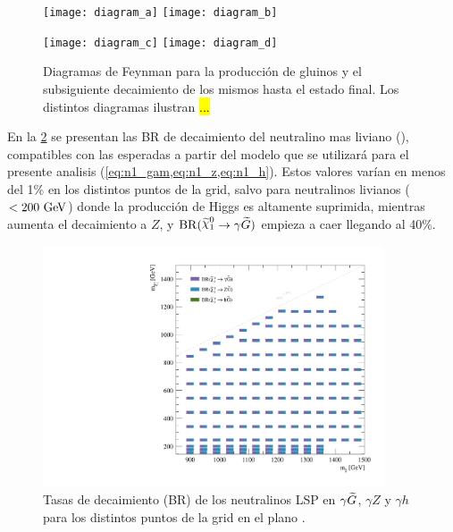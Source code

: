 \begin{figure}[!htb]
  \centering

  \texttt{[image: diagram\_a]}
  \texttt{[image: diagram\_b]}

  \texttt{[image: diagram\_c]}
  \texttt{[image: diagram\_d]}

  \caption{Diagramas de Feynman para la producción de gluinos y el subsiguiente
    decaimiento de los mismos hasta el estado final. Los distintos diagramas ilustran \hl{...} }
  \label{fig:signal_diagrams}

\end{figure}


En la \cref{fig:signal_br_n1} se presentan las BR de decaimiento del neutralino
mas liviano (\ninoone), compatibles con las esperadas a partir del modelo que se
utilizará para el presente analisis (\cref{eq:n1_gam,eq:n1_z,eq:n1_h}). Estos
valores varían en menos del 1\% en los distintos puntos de la grid, salvo para
neutralinos livianos ($<200\gev$) donde la producción de Higgs es altamente
suprimida, mientras aumenta el decaimiento a $Z$, y $\mathrm{BR}(\ninoone \to
\gam \gravino)$ empieza a caer llegando al 40\%.

\begin{figure}[!htb]
  \centering

  \includegraphics[width=0.9\textwidth]{figures/br_n1_X}

  \caption{Tasas de decaimiento (BR) de los neutralinos LSP en $\gamma\widetilde{G}$, $\gamma Z$ y
  $\gamma h$ para los distintos puntos de la grid en el plano \mgmn.}
  \label{fig:signal_br_n1}
\end{figure}





